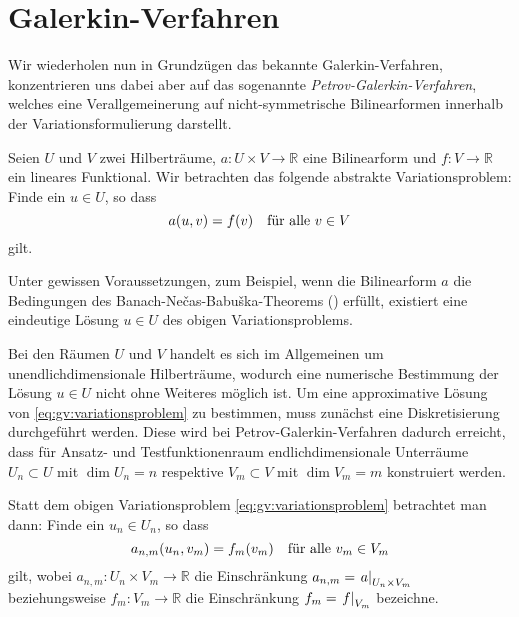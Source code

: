 

\section{Galerkin-Verfahren} %
\label{sec:galerkin_verfahren}


Wir wiederholen nun in Grundzügen das bekannte Galerkin-Verfahren, konzentrieren uns dabei aber auf das sogenannte \emph{Petrov-Galerkin-Verfahren}, welches eine Verallgemeinerung auf nicht-symmetrische Bilinearformen innerhalb der Variationsformulierung darstellt.

Seien $U$ und $V$ zwei Hilberträume, $a \colon U \times V \to \mathbb{R}$ eine Bilinearform und $f \colon V \to \mathbb{R}$ ein lineares Funktional.
Wir betrachten das folgende abstrakte Variationsproblem:
Finde ein $u \in U$, so dass
\begin{equation}
    \label{eq:gv:variationsproblem}
    a(u, v) = f(v) \quad \fa v \in V
\end{equation}
gilt.

Unter gewissen Voraussetzungen, zum Beispiel, wenn die Bilinearform $a$ die Bedingungen des Banach-Ne{\v c}as-Babu{\v s}ka-Theorems () erfüllt, existiert eine eindeutige Lösung $u \in U$ des obigen Variationsproblems.

Bei den Räumen $U$ und $V$ handelt es sich im Allgemeinen um unendlichdimensionale Hilberträume, wodurch eine numerische Bestimmung der Lösung $u \in U$ nicht ohne Weiteres möglich ist.
Um eine approximative Lösung von \eqref{eq:gv:variationsproblem} zu bestimmen, muss zunächst eine Diskretisierung durchgeführt werden.
Diese wird bei Petrov-Galerkin-Verfahren dadurch erreicht, dass für Ansatz- und Testfunktionenraum endlichdimensionale Unterräume $U_{n} \subset U$ mit $\dim U_{n} = n$ respektive $V_{m} \subset V$ mit $\dim V_{m} = m$ konstruiert werden.

Statt dem obigen Variationsproblem \eqref{eq:gv:variationsproblem} betrachtet man dann:
Finde ein $u_{n} \in U_{n}$, so dass
\begin{equation}
    \label{eq:gv:variationsproblem_diskret}
    a_{n,m}(u_{n}, v_{m}) = f_{m}(v_{m}) \quad \fa v_{m} \in V_{m}
\end{equation}
gilt, wobei $a_{n, m} \colon U_{n} \times V_{m} \to \mathbb{R}$ die Einschränkung $a_{n,m} = \left.a\right|_{U_{n} \times V_{m}}$ beziehungsweise $f_{m} \colon V_{m} \to \mathbb{R}$ die Einschränkung $f_{m} = \left.f\right|_{V_{m}}$ bezeichne.

